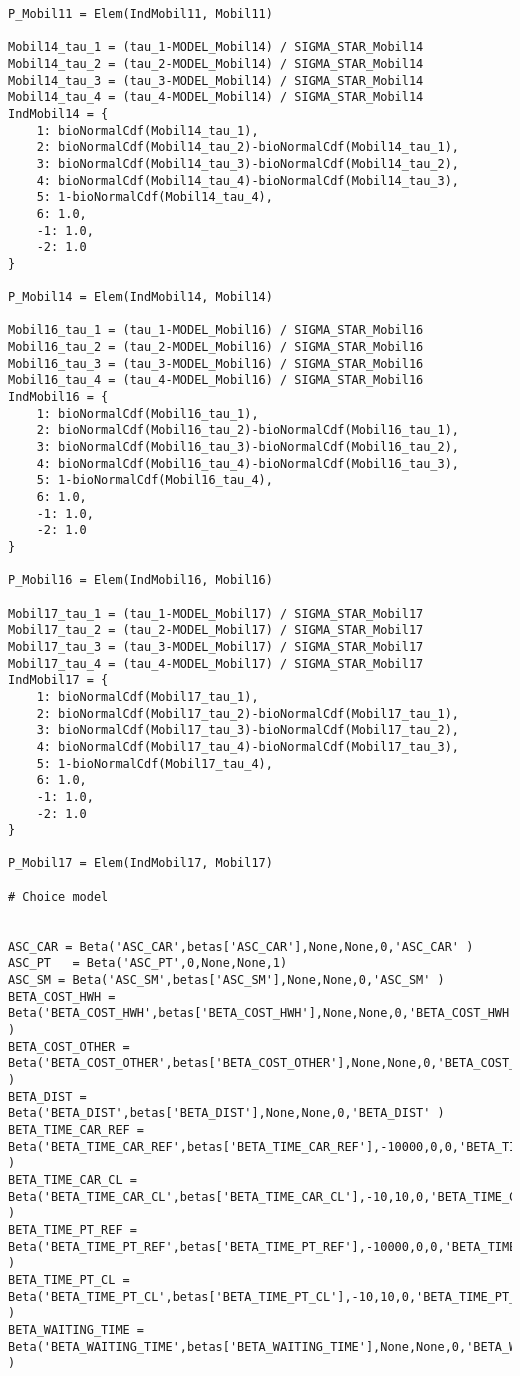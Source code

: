 \documentclass[12pt,a4paper]{article}
\begin{document}
\begin{lstlisting}[style=numbers]
P_Mobil11 = Elem(IndMobil11, Mobil11)

Mobil14_tau_1 = (tau_1-MODEL_Mobil14) / SIGMA_STAR_Mobil14
Mobil14_tau_2 = (tau_2-MODEL_Mobil14) / SIGMA_STAR_Mobil14
Mobil14_tau_3 = (tau_3-MODEL_Mobil14) / SIGMA_STAR_Mobil14
Mobil14_tau_4 = (tau_4-MODEL_Mobil14) / SIGMA_STAR_Mobil14
IndMobil14 = {
    1: bioNormalCdf(Mobil14_tau_1),
    2: bioNormalCdf(Mobil14_tau_2)-bioNormalCdf(Mobil14_tau_1),
    3: bioNormalCdf(Mobil14_tau_3)-bioNormalCdf(Mobil14_tau_2),
    4: bioNormalCdf(Mobil14_tau_4)-bioNormalCdf(Mobil14_tau_3),
    5: 1-bioNormalCdf(Mobil14_tau_4),
    6: 1.0,
    -1: 1.0,
    -2: 1.0
}

P_Mobil14 = Elem(IndMobil14, Mobil14)

Mobil16_tau_1 = (tau_1-MODEL_Mobil16) / SIGMA_STAR_Mobil16
Mobil16_tau_2 = (tau_2-MODEL_Mobil16) / SIGMA_STAR_Mobil16
Mobil16_tau_3 = (tau_3-MODEL_Mobil16) / SIGMA_STAR_Mobil16
Mobil16_tau_4 = (tau_4-MODEL_Mobil16) / SIGMA_STAR_Mobil16
IndMobil16 = {
    1: bioNormalCdf(Mobil16_tau_1),
    2: bioNormalCdf(Mobil16_tau_2)-bioNormalCdf(Mobil16_tau_1),
    3: bioNormalCdf(Mobil16_tau_3)-bioNormalCdf(Mobil16_tau_2),
    4: bioNormalCdf(Mobil16_tau_4)-bioNormalCdf(Mobil16_tau_3),
    5: 1-bioNormalCdf(Mobil16_tau_4),
    6: 1.0,
    -1: 1.0,
    -2: 1.0
}

P_Mobil16 = Elem(IndMobil16, Mobil16)

Mobil17_tau_1 = (tau_1-MODEL_Mobil17) / SIGMA_STAR_Mobil17
Mobil17_tau_2 = (tau_2-MODEL_Mobil17) / SIGMA_STAR_Mobil17
Mobil17_tau_3 = (tau_3-MODEL_Mobil17) / SIGMA_STAR_Mobil17
Mobil17_tau_4 = (tau_4-MODEL_Mobil17) / SIGMA_STAR_Mobil17
IndMobil17 = {
    1: bioNormalCdf(Mobil17_tau_1),
    2: bioNormalCdf(Mobil17_tau_2)-bioNormalCdf(Mobil17_tau_1),
    3: bioNormalCdf(Mobil17_tau_3)-bioNormalCdf(Mobil17_tau_2),
    4: bioNormalCdf(Mobil17_tau_4)-bioNormalCdf(Mobil17_tau_3),
    5: 1-bioNormalCdf(Mobil17_tau_4),
    6: 1.0,
    -1: 1.0,
    -2: 1.0
}

P_Mobil17 = Elem(IndMobil17, Mobil17)

# Choice model


ASC_CAR = Beta('ASC_CAR',betas['ASC_CAR'],None,None,0,'ASC_CAR' )
ASC_PT	 = Beta('ASC_PT',0,None,None,1)
ASC_SM = Beta('ASC_SM',betas['ASC_SM'],None,None,0,'ASC_SM' )
BETA_COST_HWH = Beta('BETA_COST_HWH',betas['BETA_COST_HWH'],None,None,0,'BETA_COST_HWH' )
BETA_COST_OTHER = Beta('BETA_COST_OTHER',betas['BETA_COST_OTHER'],None,None,0,'BETA_COST_OTHER' )
BETA_DIST = Beta('BETA_DIST',betas['BETA_DIST'],None,None,0,'BETA_DIST' )
BETA_TIME_CAR_REF = Beta('BETA_TIME_CAR_REF',betas['BETA_TIME_CAR_REF'],-10000,0,0,'BETA_TIME_CAR_REF' )
BETA_TIME_CAR_CL = Beta('BETA_TIME_CAR_CL',betas['BETA_TIME_CAR_CL'],-10,10,0,'BETA_TIME_CAR_CL' )
BETA_TIME_PT_REF = Beta('BETA_TIME_PT_REF',betas['BETA_TIME_PT_REF'],-10000,0,0,'BETA_TIME_PT_REF' )
BETA_TIME_PT_CL = Beta('BETA_TIME_PT_CL',betas['BETA_TIME_PT_CL'],-10,10,0,'BETA_TIME_PT_CL' )
BETA_WAITING_TIME = Beta('BETA_WAITING_TIME',betas['BETA_WAITING_TIME'],None,None,0,'BETA_WAITING_TIME' )


\end{lstlisting}
\end{document}
